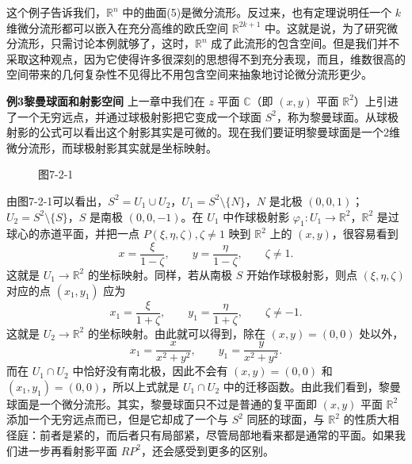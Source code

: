 这个例子告诉我们，$\mathbb R^n$ 中的曲面(5)是微分流形。反过来，也有定理说明任一个 $k$ 维微分流形都可以嵌入在充分高维的欧氏空间 $\mathbb R^{2k+1}$ 中。这就是说，为了研究微分流形，只需讨论本例就够了，这时，$\mathbb R^n$ 成了此流形的包含空间。但是我们并不采取这种观点，因为它使得许多很深刻的思想得不到充分表现，而且，维数很高的空间带来的几何复杂性不见得比不用包含空间来抽象地讨论微分流形更少。

\noindent\textbf{例3\quad 黎曼球面和射影空间}\quad
上一章中我们在 $z$ 平面 $\mathbb C$（即 $(x,y)$ 平面 $\mathbb R^2$）上引进了一个无穷远点，并通过球极射影把它变成一个球面 $S^2$，称为黎曼球面。从球极射影的公式可以看出这个射影其实是可微的。现在我们要证明黎曼球面是一个2维微分流形，而球极射影其实就是坐标映射。

\begin{figure}[htbp]
\centering
{}
\caption*{图7-2-1}
\end{figure}

由图7-2-1可以看出，$S^2=U_1\cup U_2$，$U_1=S^2\setminus\{N\}$，$N$ 是北极 $(0,0,1)$；$U_2=S^2\setminus\{S\}$，$S$ 是南极 $(0,0,-1)$。在 $U_1$ 中作球极射影 $\varphi_1:U_1\to\mathbb R^2$，$\mathbb R^2$ 是过球心的赤道平面，并把一点 $P(\xi,\eta,\zeta),\zeta\ne1$ 映到 $\mathbb R^2$ 上的 $(x,y)$，很容易看到
\[
 x=\frac{\xi}{1-\zeta},\qquad y=\frac{\eta}{1-\zeta},\qquad \zeta\ne1.
\]
这就是 $U_1\to\mathbb R^2$ 的坐标映射。同样，若从南极 $S$ 开始作球极射影，则点 $(\xi,\eta,\zeta)$ 对应的点 $(x_1,y_1)$ 应为
\[
 x_1=\frac{\xi}{1+\zeta},\qquad y_1=\frac{\eta}{1+\zeta},\qquad \zeta\ne-1.
\]
这就是 $U_2\to\mathbb R^2$ 的坐标映射。由此就可以得到，除在 $(x,y)=(0,0)$ 处以外，
\[
 x_1=\frac{x}{x^2+y^2},\qquad y_1=\frac{y}{x^2+y^2}.
\]
而在 $U_1\cap U_2$ 中恰好没有南北极，因此不会有 $(x,y)=(0,0)$ 和 $(x_1,y_1)=(0,0)$，所以上式就是 $U_1\cap U_2$ 中的迁移函数。由此我们看到，黎曼球面是一个微分流形。其实，黎曼球面只不过是普通的复平面即 $(x,y)$ 平面 $\mathbb R^2$ 添加一个无穷远点而已，但是它却成了一个与 $S^2$ 同胚的球面，与 $\mathbb R^2$ 的性质大相径庭：前者是紧的，而后者只有局部紧，尽管局部地看来都是通常的平面。如果我们进一步再看射影平面 $RP^2$，还会感受到更多的区别。

